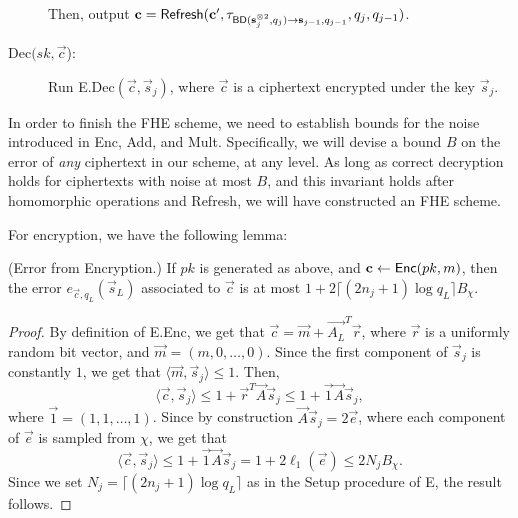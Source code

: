 \begin{description}
        Then, output $\vec{c} = {\sf Refresh}(\vec{c}', \tau_{{\sf BD}(\vec{s}_j^{\otimes 2}, q_j) \to \vec{s}_{j-1}, q_{j-1}}, q_j, q_{j-1})$.

        \item[Dec$(sk, \vec{c}$):] Run \textsf{E.Dec}$(\vec{c}, \vec{s}_j)$, where $\vec{c}$ is a ciphertext encrypted under the key $\vec{s}_j$.
    \end{description}

    In order to finish the FHE scheme, we need to establish bounds for the noise introduced in \textsf{Enc}, \textsf{Add}, and \textsf{Mult}. Specifically, we will devise a bound $B$ on the error of \emph{any} ciphertext in our scheme, at any level. As long as correct decryption holds for ciphertexts with noise at most $B$, and this invariant holds after homomorphic operations and \textsf{Refresh}, we will have constructed an FHE scheme.

    For encryption, we have the following lemma:
    \begin{lemma} \label{lem:bgvencerror} (Error from Encryption.)
        If $pk$ is generated as above, and $\vec{c} \leftarrow {\sf Enc}(pk, m)$, then the error $e_{\vec{c}, q_L}(\vec{s}_L)$ associated to $\vec{c}$ is at most $1 + 2 \lceil (2n_j + 1) \log q_L \rceil B_\chi$.
    \end{lemma}
    \begin{proof}
        By definition of \textsf{E.Enc}, we get that $\vec{c} = \vec{m} + \vec{A_L}^T \vec{r}$, where $\vec{r}$ is a uniformly random bit vector, and $\vec{m} = (m, 0, \dots, 0)$. Since the first component of $\vec{s}_j$ is constantly $1$, we get that $\langle \vec{m}, \vec{s}_j \rangle \leq 1$. Then,
        \[\langle \vec{c}, \vec{s}_j \rangle \leq 1 + \vec{r}^T \vec{A} \vec{s}_j \leq 1 + \vec{1} \vec{A} \vec{s}_j,\]
        where $\vec{1} = (1, 1, \dots, 1)$. Since by construction $\vec{A} \vec{s}_j = 2 \vec{e}$, where each component of $\vec{e}$ is sampled from $\chi$, we get that
        \[\langle \vec{c}, \vec{s}_j \rangle \leq 1 + \vec{1} \vec{A} \vec{s}_j = 1 + 2 \ell_1(\vec{e}) \leq 2 N_j B_\chi.\]
        Since we set $N_j = \lceil (2n_j + 1) \log q_L \rceil$ as in the \textsf{Setup} procedure of \textsf{E}, the result follows.
    \end{proof}

